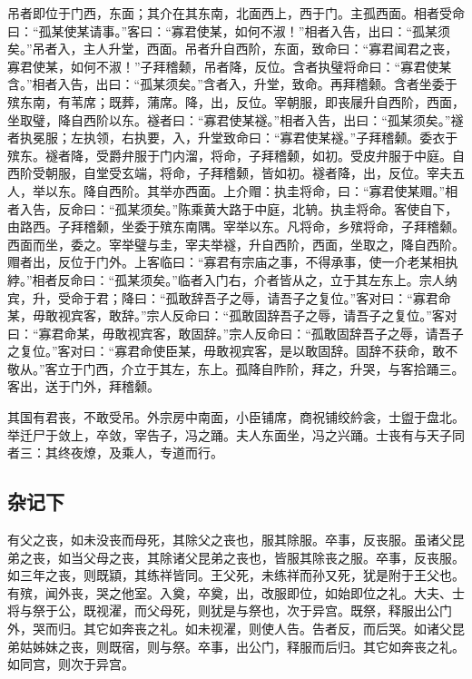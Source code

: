 \documentclass[]{article}
\begin{document}
吊者即位于门西，东面；其介在其东南，北面西上，西于门。主孤西面。相者受命曰：``孤某使某请事。''客曰：``寡君使某，如何不淑！''相者入告，出曰：``孤某须矣。''吊者入，主人升堂，西面。吊者升自西阶，东面，致命曰：``寡君闻君之丧，寡君使某，如何不淑！''子拜稽颡，吊者降，反位。含者执璧将命曰：``寡君使某含。''相者入告，出曰：``孤某须矣。''含者入，升堂，致命。再拜稽颡。含者坐委于殡东南，有苇席；既葬，蒲席。降，出，反位。宰朝服，即丧屦升自西阶，西面，坐取璧，降自西阶以东。襚者曰：``寡君使某襚。''相者入告，出曰：``孤某须矣。''襚者执冕服；左执领，右执要，入，升堂致命曰：``寡君使某襚。''子拜稽颡。委衣于殡东。襚者降，受爵弁服于门内溜，将命，子拜稽颡，如初。受皮弁服于中庭。自西阶受朝服，自堂受玄端，将命，子拜稽颡，皆如初。襚者降，出，反位。宰夫五人，举以东。降自西阶。其举亦西面。上介赗：执圭将命，曰：``寡君使某赗。''相者入告，反命曰：``孤某须矣。''陈乘黄大路于中庭，北辀。执圭将命。客使自下，由路西。子拜稽颡，坐委于殡东南隅。宰举以东。凡将命，乡殡将命，子拜稽颡。西面而坐，委之。宰举璧与圭，宰夫举襚，升自西阶，西面，坐取之，降自西阶。赗者出，反位于门外。上客临曰：``寡君有宗庙之事，不得承事，使一介老某相执綍。''相者反命曰：``孤某须矣。''临者入门右，介者皆从之，立于其左东上。宗人纳宾，升，受命于君；降曰：``孤敢辞吾子之辱，请吾子之复位。''客对曰：``寡君命某，毋敢视宾客，敢辞。''宗人反命曰：``孤敢固辞吾子之辱，请吾子之复位。''客对曰：``寡君命某，毋敢视宾客，敢固辞。''宗人反命曰：``孤敢固辞吾子之辱，请吾子之复位。''客对曰：``寡君命使臣某，毋敢视宾客，是以敢固辞。固辞不获命，敢不敬从。''客立于门西，介立于其左，东上。孤降自阼阶，拜之，升哭，与客拾踊三。客出，送于门外，拜稽颡。

其国有君丧，不敢受吊。外宗房中南面，小臣铺席，商祝铺绞紟衾，士盥于盘北。举迁尸于敛上，卒敛，宰告子，冯之踊。夫人东面坐，冯之兴踊。士丧有与天子同者三：其终夜燎，及乘人，专道而行。

\hypertarget{header-n573}{%
\subsection{杂记下}\label{header-n573}}

有父之丧，如未没丧而母死，其除父之丧也，服其除服。卒事，反丧服。虽诸父昆弟之丧，如当父母之丧，其除诸父昆弟之丧也，皆服其除丧之服。卒事，反丧服。如三年之丧，则既顈，其练祥皆同。王父死，未练祥而孙又死，犹是附于王父也。有殡，闻外丧，哭之他室。入奠，卒奠，出，改服即位，如始即位之礼。大夫、士将与祭于公，既视濯，而父母死，则犹是与祭也，次于异宫。既祭，释服出公门外，哭而归。其它如奔丧之礼。如未视濯，则使人告。告者反，而后哭。如诸父昆弟姑姊妹之丧，则既宿，则与祭。卒事，出公门，释服而后归。其它如奔丧之礼。如同宫，则次于异宫。
\end{document}
